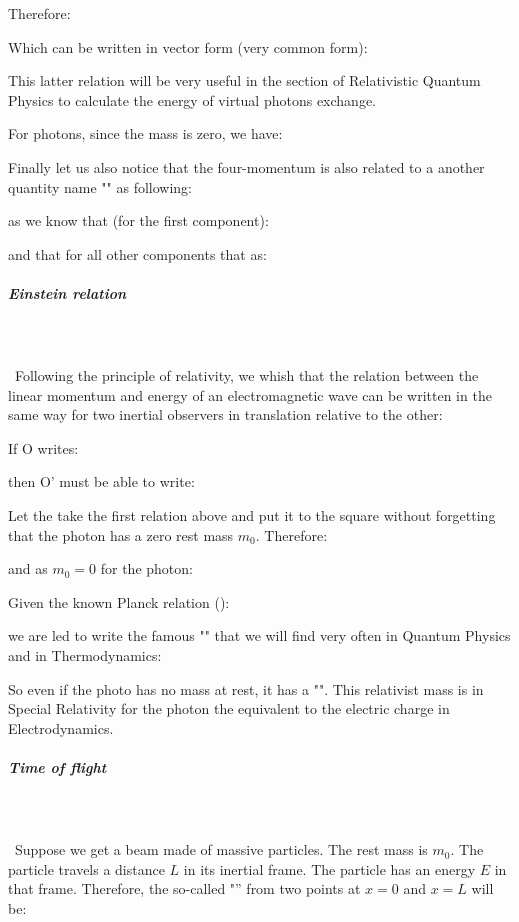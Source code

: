 	Therefore:
	
	Which can be written in vector form (very common form):
	
	This latter relation will be very useful in the section of Relativistic Quantum Physics to calculate the energy of virtual photons exchange.

	For photons, since the mass is zero, we have:
	
	Finally let us also notice that the four-momentum is also related to a another quantity name "" as following:
	
	as we know that (for the first component):
	
	and that for all other components that as:
	
	
	\subparagraph{Einstein relation}\mbox{}\\\\\
	Following the principle of relativity, we whish that the relation between the linear momentum and energy of an electromagnetic wave can be written in the same way for two inertial observers in translation relative to the other:

	If O writes:
	
	then O' must be able to write:
	
	Let the take the first relation above and put it to the square without forgetting that the photon has a zero rest mass $m_0$. Therefore:
	
	and as $m_0=0$ for the photon:
	
	Given the known Planck relation ():
	
	we are led to write the famous "" that we will find very often in Quantum Physics and in Thermodynamics:
		
	So even if the photo has no mass at rest, it has a "". This relativist mass is in Special Relativity for the photon the equivalent to the electric charge in Electrodynamics.
	
	\subparagraph{Time of flight}\mbox{}\\\\\
	Suppose we get a beam made of massive particles. The rest mass  is $m_0$. The particle travels a distance $L$ in its inertial frame. The particle has an energy $E$ in that frame. Therefore, the so-called "” from two points at $x=0$ and $x=L$ will be:
	
